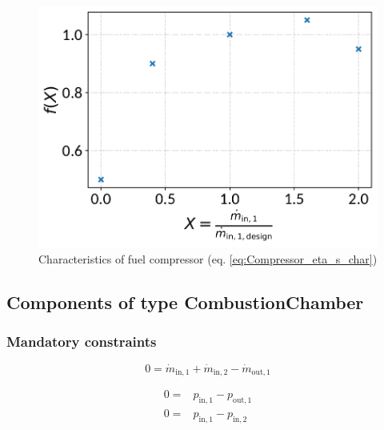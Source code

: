 \documentclass[]{article}
\begin{document}
\begin{minipage}{0.5\textwidth}
\begin{figure}[H]\begin{center}
\includegraphics[width=\textwidth]{figures/Compressor_CharLine_eta_s_char_fuel_compressor.pdf}
\caption{Characteristics of fuel compressor (eq. \ref{eq:Compressor_eta_s_char})}
\label{fig:CharLine_eta_s_char_fuel compressor}
\end{center}\end{figure}

\end{minipage}


\subsection{Components of type CombustionChamber}

\subsubsection{Mandatory constraints}

\begin{equation}
\label{eq:CombustionChamber_mass_flow_constraints}
0=\dot{m}_\mathrm{in,1} + \dot{m}_\mathrm{in,2} - \dot{m}_\mathrm{out,1}
\end{equation}

\begin{equation}
\label{eq:CombustionChamber_reactor_pressure_constraints}
\begin{split}
0 = & p_\mathrm{in,1} - p_\mathrm{out,1}\\
0 = & p_\mathrm{in,1} - p_\mathrm{in,2}\\
\end{split}
\end{equation}
\end{document}
